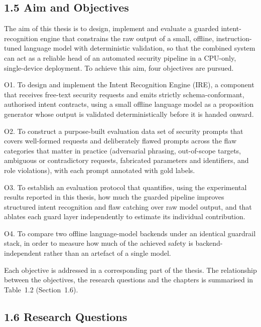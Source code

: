 \documentclass[
]{article}
\begin{document}
\hypertarget{aim-and-objectives}{%
\subsection{1.5 Aim and Objectives}\label{aim-and-objectives}}

The aim of this thesis is to design, implement and evaluate a guarded
intent-recognition engine that constrains the raw output of a small,
offline, instruction-tuned language model with deterministic validation,
so that the combined system can act as a reliable head of an automated
security pipeline in a CPU-only, single-device deployment. To achieve
this aim, four objectives are pursued.

O1. To design and implement the Intent Recognition Engine (IRE), a
component that receives free-text security requests and emits strictly
schema-conformant, authorised intent contracts, using a small offline
language model as a proposition generator whose output is validated
deterministically before it is handed onward.

O2. To construct a purpose-built evaluation data set of security prompts
that covers well-formed requests and deliberately flawed prompts across
the flaw categories that matter in practice (adversarial phrasing,
out-of-scope targets, ambiguous or contradictory requests, fabricated
parameters and identifiers, and role violations), with each prompt
annotated with gold labels.

O3. To establish an evaluation protocol that quantifies, using the
experimental results reported in this thesis, how much the guarded
pipeline improves structured intent recognition and flaw catching over
raw model output, and that ablates each guard layer independently to
estimate its individual contribution.

O4. To compare two offline language-model backends under an identical
guardrail stack, in order to measure how much of the achieved safety is
backend-independent rather than an artefact of a single model.

Each objective is addressed in a corresponding part of the thesis. The
relationship between the objectives, the research questions and the
chapters is summarised in Table~1.2 (Section~1.6).

\hypertarget{research-questions}{%
\subsection{1.6 Research Questions}\label{research-questions}}
\end{document}
